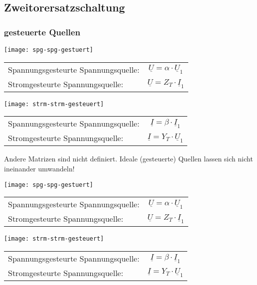 \subsection{Zweitorersatzschaltung}
\subsubsection{gesteuerte Quellen}
\begin{mdframed}[style=exercise,frametitle=Ideal]
    \begin{center}
        \texttt{[image: spg-spg-gestuert]}
    \begin{tabular}{l c}
        Spannungsgesteurte Spannungsquelle:& $\underline{U}=\alpha\cdot \underline{U}_1$\\
        Stromgesteurte Spannungsquelle:& $\underline{U}=Z_T\cdot \underline{I}_1$\\
    \end{tabular}
    \end{center}
    \begin{center}
        \texttt{[image: strm-strm-gesteuert]}
    \begin{tabular}{l c}
        Spannungsgesteurte Spannungsquelle:& $\underline{I}=\beta\cdot \underline{I}_1$\\
        Stromgesteurte Spannungsquelle:& $\underline{I}=Y_T\cdot \underline{U}_1$\\
    \end{tabular}
    \end{center}
    Andere Matrizen sind nicht definiert.  Ideale (gesteuerte) Quellen lassen
    sich nicht ineinander umwandeln!
\end{mdframed}

\begin{mdframed}[style=exercise,frametitle=Linear]
    \begin{center}
        \texttt{[image: spg-spg-gestuert]}
    \begin{tabular}{l c}
        Spannungsgesteurte Spannungsquelle:& $\underline{U}=\alpha\cdot \underline{U}_1$\\
        Stromgesteurte Spannungsquelle:& $\underline{U}=Z_T\cdot \underline{I}_1$\\
    \end{tabular}
    \end{center}
    \begin{center}
        \texttt{[image: strm-strm-gesteuert]}
    \begin{tabular}{l c}
        Spannungsgesteurte Spannungsquelle:& $\underline{I}=\beta\cdot \underline{I}_1$\\
        Stromgesteurte Spannungsquelle:& $\underline{I}=Y_T\cdot \underline{U}_1$\\
    \end{tabular}
    \end{center}
\end{mdframed}
